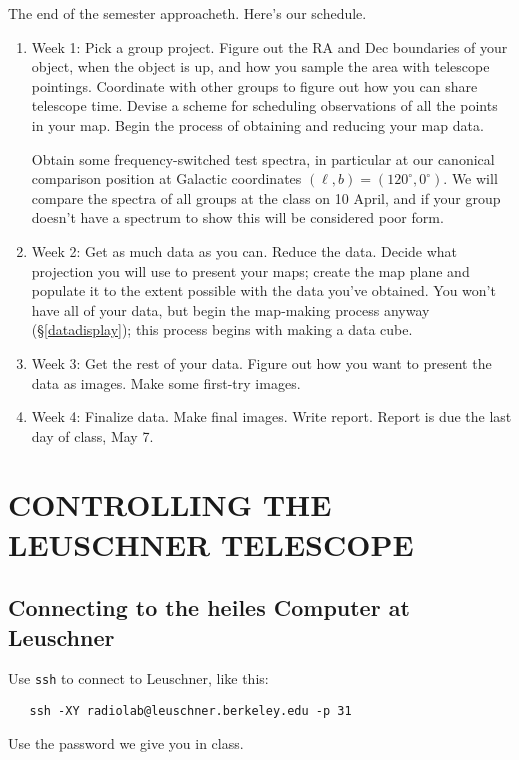 \documentclass[psfig,preprint]{aastex}
\begin{document}
The end of the semester approacheth. Here's our
schedule.  \begin{enumerate}

\item Week 1: Pick a group project. Figure out the RA and
  Dec boundaries of your object, when the object is up, and how you
  sample the area with telescope pointings. Coordinate with other groups
  to figure out how you can share telescope time.
Devise a scheme for scheduling observations of all the points in your
map.  Begin the process of obtaining and reducing your map data. 

Obtain some frequency-switched test spectra, in
particular at our canonical comparison position at Galactic coordinates
$(\ell, b) = (120^\circ, 0^\circ)$.  We will compare the spectra of all
groups at the class on 10 April, and if your group doesn't have a
spectrum to show this will be considered poor form.

\item Week 2: Get as much data as you can. Reduce the data.  Decide what
  projection you will use to present your maps; create the map plane and
  populate it to the extent possible with the data you've obtained.  You
  won't have all of your data, but begin the map-making process anyway
  (\S \ref{datadisplay}); this process begins with making a data cube.

\item Week 3: Get the rest of your data. Figure out
  how you want to present the data as images. Make some first-try
  images. 

\item Week 4: Finalize data. Make final images. Write
report. Report is due the last day of class, May 7.
\end{enumerate}

\section {CONTROLLING THE LEUSCHNER TELESCOPE}

\subsection {Connecting to the heiles Computer at Leuschner}
Use {\tt ssh} to connect to Leuschner, like this:
\begin{verbatim}
   ssh -XY radiolab@leuschner.berkeley.edu -p 31
\end{verbatim}
\noindent Use the password we give you in class.
\end{document}
